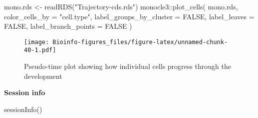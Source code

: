 \documentclass[
  openany]{book}
\newenvironment{Shaded}{\begin{snugshade}}{\end{snugshade}}
\newcommand{\AttributeTok}[1]{\textcolor[rgb]{0.77,0.63,0.00}{#1}}
\newcommand{\ConstantTok}[1]{\textcolor[rgb]{0.00,0.00,0.00}{#1}}
\newcommand{\FunctionTok}[1]{\textcolor[rgb]{0.00,0.00,0.00}{#1}}
\newcommand{\NormalTok}[1]{#1}
\newcommand{\OtherTok}[1]{\textcolor[rgb]{0.56,0.35,0.01}{#1}}
\newcommand{\SpecialCharTok}[1]{\textcolor[rgb]{0.00,0.00,0.00}{#1}}
\newcommand{\StringTok}[1]{\textcolor[rgb]{0.31,0.60,0.02}{#1}}
\begin{document}
\begin{Shaded}
\begin{Highlighting}[]
\NormalTok{mono.rds }\OtherTok{\textless{}{-}} \FunctionTok{readRDS}\NormalTok{(}\StringTok{"Trajectory{-}cds.rds"}\NormalTok{)}
\NormalTok{monocle3}\SpecialCharTok{::}\FunctionTok{plot\_cells}\NormalTok{(}
\NormalTok{  mono.rds,}
  \AttributeTok{color\_cells\_by =} \StringTok{"cell.type"}\NormalTok{,}
  \AttributeTok{label\_groups\_by\_cluster =} \ConstantTok{FALSE}\NormalTok{,}
  \AttributeTok{label\_leaves =} \ConstantTok{FALSE}\NormalTok{,}
  \AttributeTok{label\_branch\_points =} \ConstantTok{FALSE}
\NormalTok{)}
\end{Highlighting}
\end{Shaded}

\begin{figure}
\centering
\texttt{[image: Bioinfo-figures\_files/figure-latex/unnamed-chunk-40-1.pdf]}
\caption{\label{fig:unnamed-chunk-40}Pseudo-time plot showing how individual cells progress through the development}
\end{figure}

\clearpage

\textbf{Session info}

\begin{Shaded}
\begin{Highlighting}[]
\FunctionTok{sessionInfo}\NormalTok{()}
\end{Highlighting}
\end{Shaded}
\end{document}
